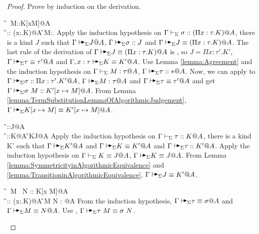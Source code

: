 \begin{proof}
    Prove by induction on the derivation.
    \begin{rneqncase}{\KApp}{
            \G\V \sigma\ M::K[x\mapsto M]@A \\
            \G\V \sigma:: (\Pi x:\tau.K)@A  \G\V M:\tau@A.
        }
        Apply the induction hypothesis on \( \Gamma\vdash_\Sigma \sigma:: (\Pi x:\tau.K)@A \),
        there is a kind \( J \) such that \( \G\AVS J @A \), \( \G\AVS \sigma
        :: J \) and \( \G\AVS J \E (\Pi x:\tau.K)@A \).  The last rule of the
        derivation of \( \G\AVS J \E (\Pi x:\tau.K)@A \) is \QTAAbs, so \( J =
        \Pi x:\tau'.K' \), \( \G \AVS \tau \E \tau' @ A \) and \( \G, x:\tau
        \AVS K \E K' @ A \).  Use Lemma \ref{lemma:Agreement} and the induction
        hypothesis on \( \Gamma \vdash_\Sigma M : \tau @ A \), \( \G \AVS \tau :: * @ A \).
        Now, we can apply \KAApp to \( \G \AVS \sigma :: \Pi x:\tau'.K' @ A \),
        \( \G \AVS M: \tau @ A \) and \( \G \AVS \tau \E \tau' @ A\) and get \(
        \G \AVS \sigma\ M :: K'[x \mapsto M] @ A \).  From Lemma
        \ref{lemma:TermSubstitutionLemmaOfAlgorithmicJudgement}, \( \G \AVS K[x
        \mapsto M] \E K'[x \mapsto M] @ A \).
    \end{rneqncase}
    \begin{rneqncase}{\KConv}{
            \G\V \tau::J@A \\
            \G\V \tau::K@A 
            \G\V K\equiv J@A
        }
        Apply the induction hypothesis on \( \Gamma\vdash_\Sigma \tau::K@A \),
        there is a kind K' such that \( \G \AVS K' @ A \) and 
        \( \G \AVS K\E K' @ A \) and \( \G\AVS \tau :: K' @ A \).
        Apply the induction hypothesis on \( \Gamma\vdash_\Sigma K\equiv J@A \),
        \( \G\AVS K\equiv J@A \).
        From Lemma \ref{lemma:SymmetricityinAlgorithmicEquivalence} and
        \ref {lemma:TransitioninAlgorithmicEquivalence}, \( \G \AVS J \E K' @ A \).
    \end{rneqncase}
    \begin{rneqncase}{\QTApp}{
            \G\V \tau\ M \E \sigma\ N :: K[x \mapsto M]@A \\
            \G\V \tau \E \sigma :: (\Pi x:\rho.K)@A 
            \G\V M \E N : \rho @A
        }
        From the induction hypothesis, \( \G\AVS \tau \E \sigma@A \) and \(
        \G\AVS M \E N @A \). Use \TAApp, \( \G\AVS \tau\ M \E \sigma\ N \).
    \end{rneqncase}

\end{proof}
